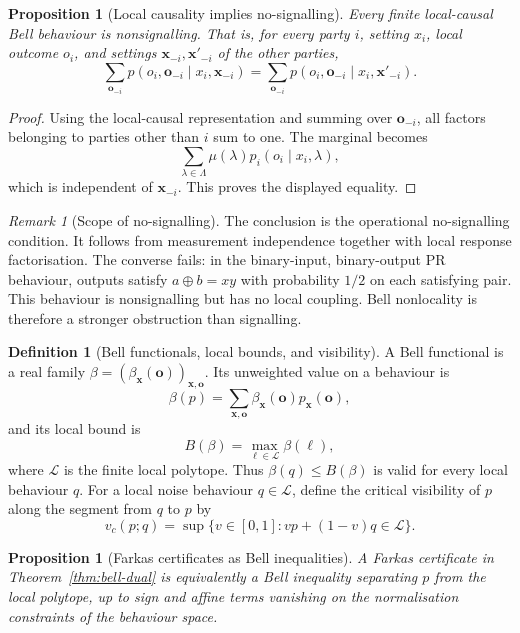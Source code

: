 \documentclass[11pt]{article}
\theoremstyle{plain}
\newtheorem{proposition}[theorem]{Proposition}
\theoremstyle{definition}
\newtheorem{definition}[theorem]{Definition}
\theoremstyle{remark}
\newtheorem{remark}[theorem]{Remark}
\begin{document}
\begin{proposition}[Local causality implies no-signalling]
\label{prop:local-nosignalling}
Every finite local-causal Bell behaviour is nonsignalling. That is, for every
party \(i\), setting \(x_i\), local outcome \(o_i\), and settings
\(\mathbf x_{-i},\mathbf x'_{-i}\) of the other parties,
\[
\sum_{\mathbf o_{-i}}p(o_i,
\mathbf o_{-i}\mid x_i,
\mathbf x_{-i})
=
\sum_{\mathbf o_{-i}}p(o_i,
\mathbf o_{-i}\mid x_i,
\mathbf x'_{-i}).
\]
\end{proposition}

\begin{proof}
Using the local-causal representation and summing over \(\mathbf o_{-i}\), all
factors belonging to parties other than \(i\) sum to one. The marginal becomes
\[
\sum_{\lambda\in\Lambda}
\mu(\lambda)
 p_i(o_i\mid x_i,\lambda),
\]
which is independent of \(\mathbf x_{-i}\). This proves the displayed equality.
\end{proof}

\begin{remark}[Scope of no-signalling]
The conclusion is the operational no-signalling condition. It follows from
measurement independence together with local response factorisation. The converse
fails: in the binary-input, binary-output PR behaviour, outputs satisfy
\(a\oplus b=xy\) with probability \(1/2\) on each satisfying pair. This behaviour
is nonsignalling but has no local coupling. Bell nonlocality is therefore a
stronger obstruction than signalling.
\end{remark}

\begin{definition}[Bell functionals, local bounds, and visibility]
\label{def:bell-functional-visibility}
A Bell functional is a real family
\(\beta=(\beta_{\mathbf x}(\mathbf o))_{\mathbf x,\mathbf o}\). Its unweighted value on a behaviour is
\[
\beta(p)=
\sum_{\mathbf x,
\mathbf o}
\beta_{\mathbf x}(\mathbf o)p_{\mathbf x}(\mathbf o),
\]
and its local bound is
\[
B(\beta)=\max_{\ell\in\mathcal L}\beta(\ell),
\]
where \(\mathcal L\) is the finite local polytope. Thus
\(\beta(q)\le B(\beta)\) is valid for every local behaviour \(q\). For a local
noise behaviour \(q\in\mathcal L\), define the critical visibility of \(p\) along
the segment from \(q\) to \(p\) by
\[
v_c(p;q)=\sup\{v\in[0,1]:vp+(1-v)q\in\mathcal L\}.
\]
\end{definition}

\begin{proposition}[Farkas certificates as Bell inequalities]
\label{prop:farkas-bell-functional}
A Farkas certificate in Theorem~\ref{thm:bell-dual} is equivalently a Bell
inequality separating \(p\) from the local polytope, up to sign and affine terms
vanishing on the normalisation constraints of the behaviour space.
\end{proposition}
\end{document}
